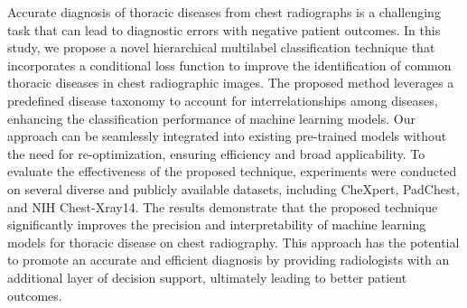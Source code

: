 Accurate diagnosis of thoracic diseases from chest radiographs is a challenging task that can lead to diagnostic errors with negative patient outcomes. In this study, we propose a novel hierarchical multilabel classification technique that incorporates a conditional loss function to improve the identification of common thoracic diseases in chest radiographic images. The proposed method leverages a predefined disease taxonomy to account for interrelationships among diseases, enhancing the classification performance of machine learning models. Our approach can be seamlessly integrated into existing pre-trained models without the need for re-optimization, ensuring efficiency and broad applicability. To evaluate the effectiveness of the proposed technique, experiments were conducted on several diverse and publicly available datasets, including CheXpert, PadChest, and NIH Chest-Xray14. The results demonstrate that the proposed technique significantly improves the precision and interpretability of machine learning models for thoracic disease on chest radiography. This approach has the potential to promote an accurate and efficient diagnosis by providing radiologists with an additional layer of decision support, ultimately leading to better patient outcomes.
